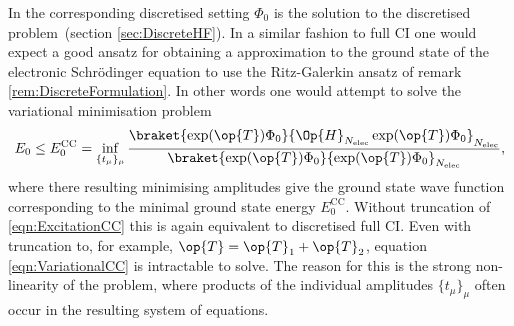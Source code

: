 In the corresponding discretised setting
$\Phi_0$ is the solution to the discretised
\HF problem~(section \vref{sec:DiscreteHF}).
In a similar fashion to full CI one would expect
a good ansatz for obtaining a \CC approximation to
the ground state of the electronic Schrödinger equation
to use the Ritz-Galerkin ansatz of remark \vref{rem:DiscreteFormulation}.
In other words one would attempt to solve the variational minimisation problem
\begin{equation}
E_0 \leq E_0^\text{CC} = \inf_{\{t_\mu\}_{\mu}} \frac{\braket{\exp(\op{T}) \Phi_0}{\Op{H}_{\Nelec} \exp(\op{T}) \Phi_0}_{\Nelec}}
	{\braket{\exp(\op{T}) \Phi_0}{\exp(\op{T}) \Phi_0}_{\Nelec}},
	\label{eqn:VariationalCC}
\end{equation}
where there resulting minimising amplitudes give the \CC ground state
wave function corresponding to the minimal ground state energy $E_0^\text{CC}$.
Without truncation of \eqref{eqn:ExcitationCC}
this is again equivalent to discretised full CI.
Even with truncation to, for example, $\op{T} = \op{T}_1 + \op{T}_2$,
equation \eqref{eqn:VariationalCC} is intractable to solve.
The reason for this is the strong non-linearity of the problem,
where products of the individual amplitudes $\{t_\mu\}_{\mu}$ often occur
in the resulting system of equations.

